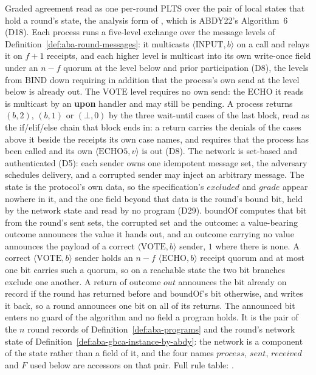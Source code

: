 \begin{definition}
  \label{def:aba-gbca-implementation}
  \leanok
  Graded agreement read as one per-round PLTS over the pair of local states that hold a round's state, the analysis form of , which is ABDY22's Algorithm~6 (D18).
  Each process runs a five-level exchange over the message levels of Definition~\ref{def:aba-round-messages}: it multicasts $\langle\mathrm{INPUT},b\rangle$ on a call and relays it on $f{+}1$ receipts, and each higher level is multicast into its own write-once field under an $n{-}f$ quorum at the level below and prior participation (D8), the levels from $\mathrm{BIND}$ down requiring in addition that the process's own send at the level below is already out.
  The $\mathrm{VOTE}$ level requires no own send: the $\mathrm{ECHO}$ it reads is multicast by an \textbf{upon} handler and may still be pending.
  A process returns $(b,2)$, $(b,1)$ or $(\bot,0)$ by the three wait-until cases of the last block, read as the if/elif/else chain that block ends in: a return carries the denials of the cases above it beside the receipts its own case names, and requires that the process has been called and its own $\langle\mathrm{ECHO5},v\rangle$ is out (D8).
  The network is set-based and authenticated (D5): each sender owns one idempotent message set, the adversary schedules delivery, and a corrupted sender may inject an arbitrary message.
  The state is the protocol's own data, so the specification's $excluded$ and $grade$ appear nowhere in it, and the one field beyond that data is the round's bound bit, held by the network state and read by no program (D29).
  $\mathrm{boundOf}$ computes that bit from the round's sent sets, the corrupted set and the outcome: a value-bearing outcome announces the value it hands out, and an outcome carrying no value announces the payload of a correct $\langle\mathrm{VOTE}, b\rangle$ sender, $1$ where there is none.
  A correct $\langle\mathrm{VOTE}, b\rangle$ sender holds an $n{-}f$ $\langle\mathrm{ECHO}, b\rangle$ receipt quorum and at most one bit carries such a quorum, so on a reachable state the two bit branches exclude one another.
  A return of outcome $out$ announces the bit already on record if the round has returned before and $\mathrm{boundOf}$'s bit otherwise, and writes it back, so a round announces one bit on all of its returns.
  The announced bit enters no guard of the algorithm and no field a program holds.
  It is the pair of the $n$ round records of Definition~\ref{def:aba-programs} and the round's network state of Definition~\ref{def:aba-gbca-instance-by-abdy}: the network is a component of the state rather than a field of it, and the four names $process$, $sent$, $received$ and $F$ used below are accessors on that pair.
  Full rule table: .
\end{definition}
